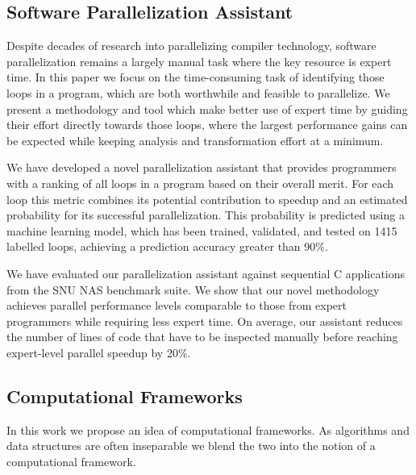 \subsection{Software Parallelization Assistant}
\quad Despite decades of research into parallelizing compiler technology, software parallelization remains a largely manual task where the key resource is expert time. In this paper we focus on the time-consuming task of identifying those loops in a program, which are both worthwhile and feasible to parallelize. We present a methodology and tool which make better use of expert time by guiding their effort directly towards those loops, where the largest performance gains can be expected while keeping analysis and transformation effort at a minimum.
  
We have developed a novel parallelization assistant that provides programmers with a ranking of all loops in a program based on their overall merit. For each loop this metric combines its potential contribution to speedup and an estimated probability for its successful parallelization. This probability is predicted using a machine learning model, which has been trained, validated, and tested on 1415 labelled loops, achieving a prediction accuracy greater than 90\%.
  
We have evaluated our parallelization assistant against sequential C applications from the SNU NAS benchmark suite. We show that our novel methodology achieves parallel performance levels comparable to those from expert programmers while requiring less expert time. On average, our assistant reduces the number of lines of code that have to be inspected manually before reaching expert-level parallel speedup by 20\%. %

\subsection{Computational Frameworks}
\quad In this work we propose an idea of computational frameworks. As algorithms and data structures are often inseparable we blend the two into the notion of a computational framework.  